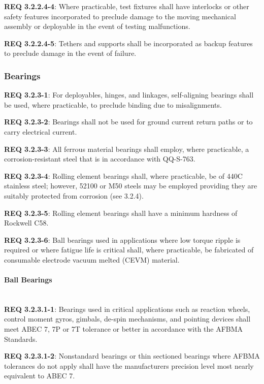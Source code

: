\documentclass[12pt]{article}
\begin{document}
\noindent \textbf{REQ 3.2.2.4-4}: Where practicable, test fixtures shall have interlocks or other safety features incorporated to preclude damage to the moving mechanical assembly or deployable in the event of testing malfunctions.
 
\noindent \textbf{REQ 3.2.2.4-5}: Tethers and supports shall be incorporated as backup features to preclude damage in the event of failure.


\clearpage
\subsubsection{Bearings} %
\noindent \textbf{REQ 3.2.3-1}: For deployables, hinges, and linkages, self-aligning bearings shall be used, where practicable, to preclude binding due to misalignments. 

\noindent \textbf{REQ 3.2.3-2}: Bearings shall not be used for ground current return paths or to carry electrical current. 

\noindent \textbf{REQ 3.2.3-3}: All ferrous material bearings shall employ, where practicable, a corrosion-resistant steel that is in accordance with QQ-S-763. 

\noindent \textbf{REQ 3.2.3-4}: Rolling element bearings shall, where practicable, be of 440C stainless steel; however, 52100 or M50 steels may be employed providing they are suitably protected from corrosion (see 3.2.4). 

\noindent \textbf{REQ 3.2.3-5}: Rolling element bearings shall have a minimum hardness of Rockwell C58. 

\noindent \textbf{REQ 3.2.3-6}: Ball bearings used in applications where low torque ripple is required or where fatigue life is critical shall, where practicable, be fabricated of consumable electrode vacuum melted (CEVM) material.


\paragraph{Ball Bearings} \mbox{} \\ %
\noindent \textbf{REQ 3.2.3.1-1}: Bearings used in critical applications such as reaction wheels, control moment gyros, gimbals, de-spin mechanisms, and pointing devices shall meet ABEC 7, 7P or 7T tolerance or better in accordance with the AFBMA Standards.
 
\noindent \textbf{REQ 3.2.3.1-2}: Nonstandard bearings or thin sectioned bearings where AFBMA tolerances do not apply shall have the manufacturers precision level most nearly equivalent to ABEC 7.
\end{document}

